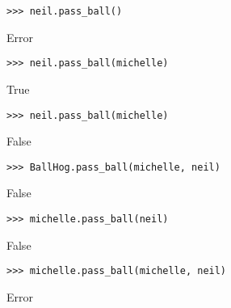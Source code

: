 \begin{blocksection}
\begin{lstlisting}
>>> neil.pass_ball()
\end{lstlisting}
\begin{solution}[.2in]
Error
\end{solution}

\begin{lstlisting}
>>> neil.pass_ball(michelle)
\end{lstlisting}
\begin{solution}[.2in]
True
\end{solution}

\begin{lstlisting}
>>> neil.pass_ball(michelle)
\end{lstlisting}
\begin{solution}[.2in]
False
\end{solution}

\begin{lstlisting}
>>> BallHog.pass_ball(michelle, neil)
\end{lstlisting}
\begin{solution}[.2in]
False
\end{solution}

\begin{lstlisting}
>>> michelle.pass_ball(neil)
\end{lstlisting}
\begin{solution}[.2in]
False
\end{solution}

\begin{lstlisting}
>>> michelle.pass_ball(michelle, neil)
\end{lstlisting}
\begin{solution}[.2in]
Error
\end{solution}
\end{blocksection}
